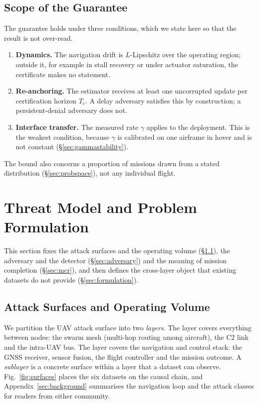 \subsection*{Scope of the Guarantee}
\label{sec:scope}
The guarantee holds under three conditions, which we state here so that the
result is not over-read.
\begin{enumerate}[label=(C\arabic*),leftmargin=2.6em]
\item\label{c:lip} \textbf{Dynamics.} The navigation drift is $L$-Lipschitz over
the operating region; outside it, for example in stall recovery or under
actuator saturation, the certificate makes no statement.
\item\label{c:anchor} \textbf{Re-anchoring.} The estimator receives at least one
uncorrupted update per certification horizon $T_c$. A delay adversary satisfies
this by construction; a persistent-denial adversary does not.
\item\label{c:interface} \textbf{Interface transfer.} The measured rate $\gamma$
applies to the deployment. This is the weakest condition, because $\gamma$ is
calibrated on one airframe in hover and is not constant
(\S\ref{sec:gammastability}).
\end{enumerate}
The bound also concerns a proportion of missions drawn from a stated
distribution (\S\ref{sec:probspace}), not any individual flight.

\section{Threat Model and Problem Formulation}
\label{sec:problem}
This section fixes the attack surfaces and the operating volume
(\S\ref{sec:surfaces}), the adversary and the detector (\S\ref{sec:adversary})
and the meaning of mission completion (\S\ref{sec:mcr}), and then defines the
cross-layer object that existing datasets do not provide
(\S\ref{sec:formulation}).

\subsection{Attack Surfaces and Operating Volume}
\label{sec:surfaces}
We partition the UAV attack surface into two \emph{layers}. The \layernet{}
layer covers everything between nodes: the swarm mesh (multi-hop routing among
aircraft), the C2 link and the intra-UAV bus. The \layerauto{} layer covers the
navigation and control stack: the GNSS receiver, sensor fusion, the flight
controller and the mission outcome. A \emph{sublayer} is a concrete surface
within a layer that a dataset can observe. Fig.~\ref{fig:surfaces} places the
six datasets on the causal chain, and Appendix~\ref{sec:background} summarises
the navigation loop and the attack classes for readers from either community.

